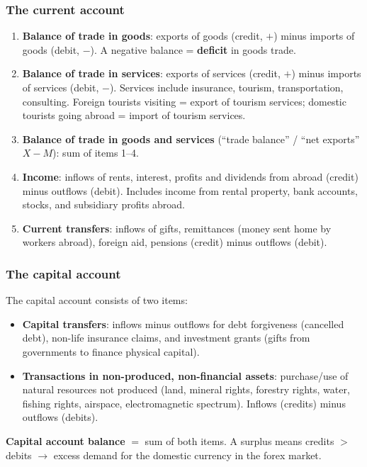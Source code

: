 \subsubsection*{The current account}
\begin{enumerate}
  \item \textbf{Balance of trade in goods}: exports of goods (credit, $+$) minus imports of goods (debit, $-$). A negative balance = \textbf{deficit} in goods trade.
  \item \textbf{Balance of trade in services}: exports of services (credit, $+$) minus imports of services (debit, $-$). Services include insurance, tourism, transportation, consulting. Foreign tourists visiting = export of tourism services; domestic tourists going abroad = import of tourism services.
  \item \textbf{Balance of trade in goods and services} (``trade balance'' / ``net exports'' $X - M$): sum of items 1--4.
  \item \textbf{Income}: inflows of rents, interest, profits and dividends from abroad (credit) minus outflows (debit). Includes income from rental property, bank accounts, stocks, and subsidiary profits abroad.
  \item \textbf{Current transfers}: inflows of gifts, remittances (money sent home by workers abroad), foreign aid, pensions (credit) minus outflows (debit).
\end{enumerate}
\subsubsection*{The capital account}
The capital account consists of two items:
\begin{itemize}
  \item \textbf{Capital transfers}: inflows minus outflows for debt forgiveness (cancelled debt), non-life insurance claims, and investment grants (gifts from governments to finance physical capital).
  \item \textbf{Transactions in non-produced, non-financial assets}: purchase/use of natural resources not produced (land, mineral rights, forestry rights, water, fishing rights, airspace, electromagnetic spectrum). Inflows (credits) minus outflows (debits).
\end{itemize}
\textbf{Capital account balance} $=$ sum of both items. A surplus means credits $>$ debits $\to$ excess demand for the domestic currency in the forex market.
